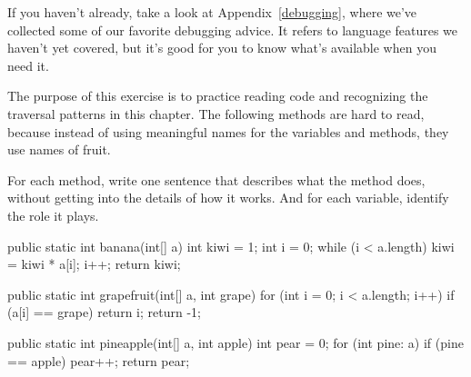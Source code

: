 If you haven't already, take a look at Appendix~\ref{debugging}, where we've collected some of our favorite debugging advice.
It refers to language features we haven't yet covered, but it's good for you to know what's available when you need it.


\begin{exercise}  %

The purpose of this exercise is to practice reading code and recognizing the traversal patterns in this chapter.
The following methods are hard to read, because instead of using meaningful names for the variables and methods, they use names of fruit.

For each method, write one sentence that describes what the method does, without getting into the details of how it works.
And for each variable, identify the role it plays.

\begin{code}
public static int banana(int[] a) {
    int kiwi = 1;
    int i = 0;
    while (i < a.length) {
        kiwi = kiwi * a[i];
        i++;
    }
    return kiwi;
}
\end{code}

\begin{code}
public static int grapefruit(int[] a, int grape) {
    for (int i = 0; i < a.length; i++) {
        if (a[i] == grape) {
            return i;
        }
    }
    return -1;
}
\end{code}

\begin{code}
public static int pineapple(int[] a, int apple) {
    int pear = 0;
    for (int pine: a) {
        if (pine == apple) {
            pear++;
        }
    }
    return pear;
}
\end{code}

\end{exercise}


